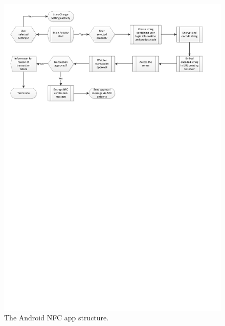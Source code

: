 \begin{figure}
 \centering 
 \includegraphics[clip = true, trim = 0 550 0 0,
 scale=0.75]{app_main_processflow}
 \caption{The Android NFC app structure.}
 \label{fig:app-welcomescreen}
\end{figure}

